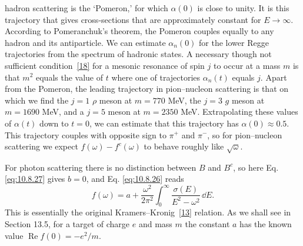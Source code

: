 
hadron scattering is the `Pomeron,' for which $\alpha(0)$ is close to unity.
It is this trajectory that gives cross-sections that are approximately
constant for $E\to\infty$. According to Pomeranchuk's theorem, the Pomeron
couples equally to any hadron and its antiparticle. We can estimate
$\alpha_n(0)$ for the lower Regge trajectories from the spectrum of hadronic
states. A necessary though not sufficient condition~\hyperref[ref:10.18]{[18]}
for a mesonic resonance of spin $j$ to occur at a mass $m$ is that $m^2$ equals
the value of $t$ where one of trajectories $\alpha_n(t)$ equals $j$. Apart from
the Pomeron, the leading trajectory in pion--nucleon scattering is that on
which we find the $j=1$ $\rho$ meson at $m=770$ MeV, the $j=3$ $g$ meson at
$m=1690$ MeV, and a $j=5$ meson at $m=2350$ MeV. Extrapolating these values of
$\alpha(t)$ down to $t=0$, we can estimate that this trajectory has
$\alpha(0)\approx0.5$. This trajectory couples with opposite sign to $\pi^+$
and $\pi^-$, so for pion--nucleon scattering we expect
$f(\omega)-f^c(\omega)$ to behave roughly like $\sqrt{\omega}$.

For photon scattering there is no distinction between $B$ and $B^c$, so here
Eq. \eqref{eq:10.8.27} gives $b=0$, and Eq. \eqref{eq:10.8.26} reads
\begin{equation}
f(\omega)=a+\frac{\omega^2}{2\pi^2}
\int_0^\infty \frac{\sigma(E)}{E^2-\omega^2}\,\dd E.
\tag{10.8.29}\label{eq:10.8.29}
\end{equation}
This is essentially the original Kramers--Kronig~\hyperref[ref:10.13]{[13]}
relation. As we shall see in Section 13.5, for a target of charge $e$ and mass
$m$ the constant $a$ has the known value $\operatorname{Re}f(0)=-e^2/m$.


